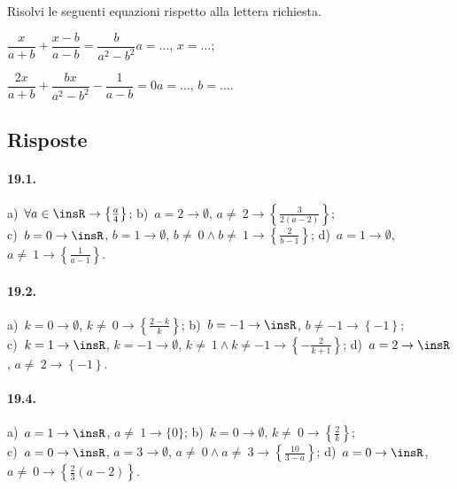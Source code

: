 \begin{esercizio}[\Ast]
\label{ese:19.43}
Risolvi le seguenti equazioni rispetto alla lettera richiesta.
\TabPositions{5cm}
\begin{enumeratea}
 \item $\dfrac{x}{a+b}+\dfrac{x-b}{a-b}=\dfrac{b}{a^{2}-b^{2}}$\tab$a=\ldots$, $x=\ldots$;
 \item $\dfrac{2x}{a+b}+\dfrac{bx}{a^{2}-b^{2}}-\dfrac{1}{a-b}=0$\tab$a=\ldots$, $b=\ldots$.
\end{enumeratea}
\end{esercizio}

\subsection{Risposte}
\paragraph{19.1.}
a)~$\forall a\in \insR \rightarrow \left\{\frac{a}{4}\right\}$;
\quad b)~$a=2 \rightarrow \emptyset$, $a\neq~2 \rightarrow \left\{\frac{3}{2(a-2)}\right\}$;
\quad \protect\\
c)~$b=0 \rightarrow \insR$, $b=1\rightarrow\emptyset$, $b\neq~0\wedge b\neq~1\rightarrow \left\{\frac{2}{b-1}\right\}$;
\quad d)~$a=1\rightarrow \emptyset$, $a\neq~1\rightarrow \left\{\frac{1}{a-1}\right\}$.

\paragraph{19.2.}
a)~$k=0 \rightarrow \emptyset$, $k\neq~0 \rightarrow \left\{\frac{2-k}{k}\right\}$;
\quad b)~$b=-1 \rightarrow \insR$, $b\neq -1 \rightarrow \left\{-1\right\}$;
\quad \protect\\
c)~$k=1 \rightarrow \insR$, $k=-1 \rightarrow \emptyset$, $k\neq~1\wedge k\neq -1 \rightarrow \left\{-{\frac{2}{k+1}}\right\}$;
\quad d)~$a=2 \rightarrow \insR$, $a\neq~2 \rightarrow \left\{-1\right\}$.

\paragraph{19.4.}
a)~$a=1 \rightarrow \insR$, $a\neq~1 \rightarrow \{0\}$;
\quad b)~$k=0 \rightarrow \emptyset$, $k\neq~0 \rightarrow \left\{\frac{2}{k}\right\}$;
\quad \protect\\
c)~$a=0 \rightarrow \insR$, $a=3\rightarrow \emptyset$, $a\neq~0 \wedge a\neq~3 \rightarrow \left\{\frac{10}{3-a}\right\}$;
\quad d)~$a=0 \rightarrow \insR$, $a\neq~0 \rightarrow \left\{\frac{2}{3} (a-2)\right\}$.


